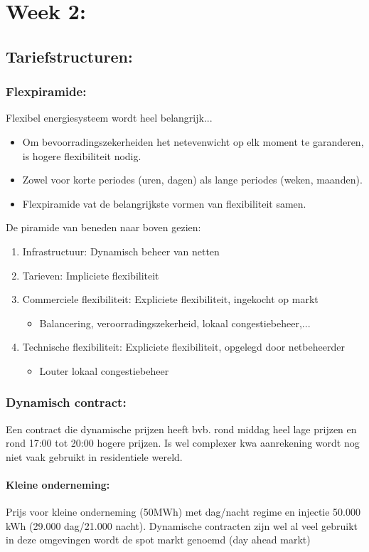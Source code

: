 \documentclass[12pt]{article}
\begin{document}
\section{Week 2:}
\subsection{Tariefstructuren:}
\subsubsection{Flexpiramide:}
Flexibel energiesysteem wordt heel belangrijk...\begin{itemize}
    \item Om bevoorradingszekerheiden het netevenwicht op elk moment te garanderen, is hogere flexibiliteit nodig.
    \item Zowel voor korte periodes (uren, dagen) als lange periodes (weken, maanden).
    \item Flexpiramide vat de belangrijkste vormen van flexibiliteit samen.
\end{itemize}
De piramide van beneden naar boven gezien:
\begin{enumerate}
    \item Infrastructuur: Dynamisch beheer van netten
    \item Tarieven: Impliciete flexibiliteit 
    \item Commerciele flexibiliteit: Expliciete flexibiliteit, ingekocht op markt\begin{itemize}
        \item Balancering, veroorradingszekerheid, lokaal congestiebeheer,...
    \end{itemize}
    \item Technische flexibiliteit: Expliciete flexibiliteit, opgelegd door netbeheerder\begin{itemize}
        \item Louter lokaal congestiebeheer
    \end{itemize}
\end{enumerate}
\subsubsection{Dynamisch contract:}
Een contract die dynamische prijzen heeft bvb. rond middag heel lage prijzen en rond 17:00 tot 20:00 hogere prijzen. Is wel complexer kwa aanrekening wordt nog niet vaak gebruikt in residentiele wereld. 
\paragraph{Kleine onderneming:}
Prijs voor kleine onderneming (50MWh) met dag/nacht regime en injectie 50.000 kWh (29.000 dag/21.000 nacht). Dynamische contracten zijn wel al veel gebruikt in deze omgevingen wordt de spot markt genoemd (day ahead markt)
\end{document}
